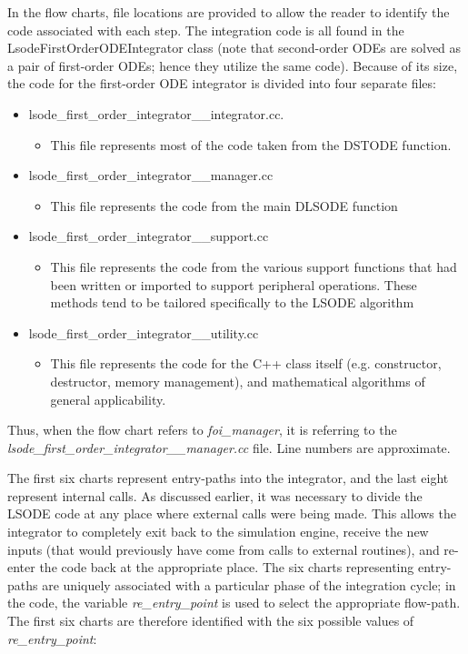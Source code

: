 In the flow charts, file locations are provided to allow the reader to
identify the code associated with each step.
The integration code is all found in the LsodeFirstOrderODEIntegrator
class (note that second-order ODEs are solved as a pair of first-order
ODEs; hence they 
utilize the same code).  Because of its size, the code for the first-order
ODE integrator is divided into four separate files:
\begin{itemize}
 \item lsode\_first\_order\_integrator\_\_integrator.cc.
 \begin{itemize}
  \item This file represents most of the code taken from the DSTODE function.
 \end{itemize}

 \item lsode\_first\_order\_integrator\_\_manager.cc
 \begin{itemize}
  \item This file represents the code from the main DLSODE function
 \end{itemize}

 \item lsode\_first\_order\_integrator\_\_support.cc
 \begin{itemize}
  \item This file represents the code from the various support functions that
  had been written or imported to support peripheral operations.  These methods
  tend to be tailored specifically to the LSODE algorithm
 \end{itemize}

 \item lsode\_first\_order\_integrator\_\_utility.cc
 \begin{itemize}
  \item This file represents the code for the C++ class itself (e.g.
  constructor, destructor, memory management), and mathematical algorithms of
  general applicability.
 \end{itemize}
\end{itemize}

Thus, when the flow chart refers to \textit{foi\_manager}, it is referring to
the \newline
\textit{lsode\_first\_order\_integrator\_\_manager.cc} file.  Line numbers
are approximate.


The first six charts represent entry-paths into the integrator, and the last
eight represent internal calls.
As discussed earlier, it was necessary to divide the LSODE code at any place
where external calls were being made.
This allows the integrator to completely exit back to the simulation engine,
receive the new inputs (that would previously have come from calls to
external routines), and re-enter
the code back at the appropriate place.
The six charts representing entry-paths are uniquely associated with a
particular phase of the integration cycle; in the code, the variable
\textit{re\_entry\_point} is used to select the appropriate flow-path.  The
first six charts are therefore identified with the six possible values of
\textit{re\_entry\_point}:

